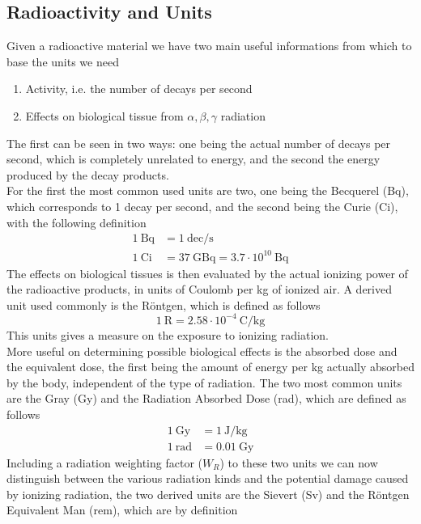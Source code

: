 \documentclass[../qm.tex]{subfiles}
\begin{document}
\subsection{Radioactivity and Units}
Given a radioactive material we have two main useful informations from which to base the units we need
\begin{enumerate}
\item Activity, i.e. the number of decays per second
\item Effects on biological tissue from $\alpha,\beta,\gamma$ radiation
\end{enumerate}
The first can be seen in two ways: one being the actual number of decays per second, which is completely unrelated to energy, and the second the energy produced by the decay products.\\
For the first the most common used units are two, one being the Becquerel (Bq), which corresponds to 1 decay per second, and the second being the Curie (Ci), with the following definition
\begin{equation*}
	\begin{aligned}
		1\ \mathrm{Bq}&=1\ \mathrm{dec/s}\\
		1\ \mathrm{Ci}&=37\ \mathrm{GBq}=3.7\cdot10^{10}\ \mathrm{Bq}
	\end{aligned}
\end{equation*}
The effects on biological tissues is then evaluated by the actual ionizing power of the radioactive products, in units of Coulomb per kg of ionized air. A derived unit used commonly is the Röntgen, which is defined as follows
\begin{equation*}
	1\ \mathrm{R}=2.58\cdot10^{-4}\ \mathrm{C/kg}
\end{equation*}
This units gives a measure on the exposure to ionizing radiation.\\
More useful on determining possible biological effects is the absorbed dose and the equivalent dose, the first being the amount of energy per kg actually absorbed by the body, independent of the type of radiation. The two most common units are the Gray (Gy) and the Radiation Absorbed Dose (rad), which are defined as follows
\begin{equation*}
	\begin{aligned}
		1\ \mathrm{Gy}&=1\ \mathrm{J/kg}\\
		1\ \mathrm{rad}&=0.01\ \mathrm{Gy}
	\end{aligned}
\end{equation*}
Including a radiation weighting factor ($W_R$) to these two units we can now distinguish between the various radiation kinds and the potential damage caused by ionizing radiation, the two derived units are the Sievert (Sv) and the Röntgen Equivalent Man (rem), which are by definition
\end{document}
